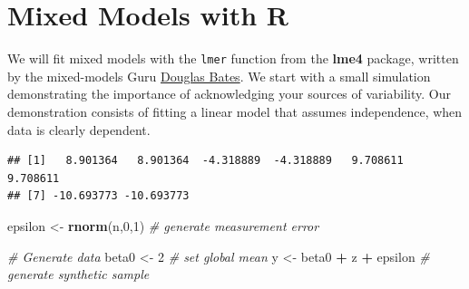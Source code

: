\documentclass[]{book}
\newenvironment{Shaded}{\begin{snugshade}}{\end{snugshade}}
\newcommand{\KeywordTok}[1]{\textcolor[rgb]{0.13,0.29,0.53}{\textbf{#1}}}
\newcommand{\DataTypeTok}[1]{\textcolor[rgb]{0.13,0.29,0.53}{#1}}
\newcommand{\DecValTok}[1]{\textcolor[rgb]{0.00,0.00,0.81}{#1}}
\newcommand{\StringTok}[1]{\textcolor[rgb]{0.31,0.60,0.02}{#1}}
\newcommand{\CommentTok}[1]{\textcolor[rgb]{0.56,0.35,0.01}{\textit{#1}}}
\newcommand{\OperatorTok}[1]{\textcolor[rgb]{0.81,0.36,0.00}{\textbf{#1}}}
\newcommand{\NormalTok}[1]{#1}
\theoremstyle{definition}
\theoremstyle{definition}
\theoremstyle{definition}
\theoremstyle{remark}
\begin{document}
\section{Mixed Models with R}\label{mixed-models-with-r}

We will fit mixed models with the \texttt{lmer} function from the
\textbf{lme4} package, written by the mixed-models Guru
\href{http://www.stat.wisc.edu/~bates/}{Douglas Bates}. We start with a
small simulation demonstrating the importance of acknowledging your
sources of variability. Our demonstration consists of fitting a linear
model that assumes independence, when data is clearly dependent.

\begin{Shaded}
\end{Shaded}

\begin{verbatim}
## [1]   8.901364   8.901364  -4.318889  -4.318889   9.708611   9.708611
## [7] -10.693773 -10.693773
\end{verbatim}

\begin{Shaded}
\begin{Highlighting}[]
\NormalTok{epsilon <-}\StringTok{ }\KeywordTok{rnorm}\NormalTok{(n,}\DecValTok{0}\NormalTok{,}\DecValTok{1}\NormalTok{) }\CommentTok{# generate measurement error}

\CommentTok{# Generate data}
\NormalTok{beta0 <-}\StringTok{ }\DecValTok{2} \CommentTok{# set global mean}
\NormalTok{y <-}\StringTok{ }\NormalTok{beta0 }\OperatorTok{+}\StringTok{ }\NormalTok{z }\OperatorTok{+}\StringTok{ }\NormalTok{epsilon }\CommentTok{# generate synthetic sample}
\end{Highlighting}
\end{Shaded}
\end{document}
